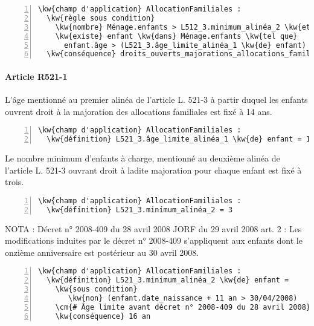 \documentclass[12pt, french]{article}
\newcommand{\cm}[1]{\textbf{\textcolor{Gray}{#1}}}
\newcommand{\kw}[1]{\textbf{\textcolor{OliveGreen}{#1}}}
\begin{document}
\begin{Verbatim}[commandchars=\\\{\}, numbers=left,xleftmargin=5mm, firstnumber=last]
\kw{champ d'application} AllocationFamiliales :
  \kw{règle sous condition}
    \kw{nombre} Ménage.enfants > L512_3.minimum_alinéa_2 \kw{et}
    \kw{existe} enfant \kw{dans} Ménage.enfants \kw{tel que}
      enfant.âge > (L521_3.âge_limite_alinéa_1 \kw{de} enfant)
  \kw{conséquence} droits_ouverts_majorations_allocations_familiales \kw{rempli}
\end{Verbatim}

\paragraph{Article R521-1}

L'âge mentionné au premier alinéa de l'article L. 521-3 à partir duquel les enfants ouvrent droit à la majoration des allocations familiales est fixé à 14 ans.
\begin{Verbatim}[commandchars=\\\{\}, numbers=left,xleftmargin=5mm, firstnumber=last]
\kw{champ d'application} AllocationFamiliales :
  \kw{définition} L521_3.âge_limite_alinéa_1 \kw{de} enfant = 14 an
\end{Verbatim}

Le nombre minimum d'enfants à charge, mentionné au deuxième alinéa de l'article L. 521-3 ouvrant droit à ladite majoration pour chaque enfant est fixé à trois.
\begin{Verbatim}[commandchars=\\\{\}, numbers=left,xleftmargin=5mm, firstnumber=last]
\kw{champ d'application} AllocationFamiliales :
  \kw{définition} L521_3.minimum_alinéa_2 = 3
\end{Verbatim}


NOTA : Décret n° 2008-409 du 28 avril 2008 JORF du 29 avril 2008 art. 2 : Les modifications induites par le décret n° 2008-409 s'appliquent aux enfants dont le onzième anniversaire est postérieur au 30 avril 2008.

\begin{Verbatim}[commandchars=\\\{\}, numbers=left,xleftmargin=5mm, firstnumber=last]
\kw{champ d'application} AllocationFamiliales :
  \kw{définition} L521_3.minimum_alinéa_2 \kw{de} enfant =
    \kw{sous condition}
       \kw{non} (enfant.date_naissance + 11 an > 30/04/2008)
    \cm{# Âge limite avant décret n° 2008-409 du 28 avril 2008}
    \kw{conséquence} 16 an
\end{Verbatim}
\end{document}
